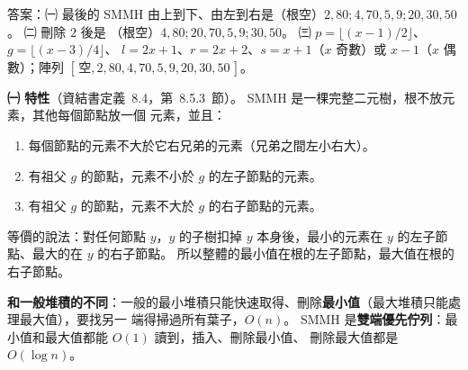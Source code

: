 \begin{pastsoln}
答案：㈠ 最後的 SMMH 由上到下、由左到右是（根空）$2, 80; 4, 70, 5, 9; 20, 30, 50$。 ㈡ 刪除 $2$ 後是
（根空）$4, 80; 20, 70, 5, 9; 30, 50$。 ㈢ $p = \lfloor (x-1)/2 \rfloor$、$g = \lfloor (x-3)/4 \rfloor$、
$l = 2x + 1$、$r = 2x + 2$、$s = x + 1$（$x$ 奇數）或 $x - 1$（$x$ 偶數）；陣列
$[\,\text{空}, 2, 80, 4, 70, 5, 9, 20, 30, 50\,]$。

\textbf{㈠ 特性}（資結書定義~8.4，第~8.5.3~節）。 SMMH 是一棵完整二元樹，根不放元素，其他每個節點放一個
元素，並且：
\begin{enumerate}
\item[P1.] 每個節點的元素不大於它右兄弟的元素（兄弟之間左小右大）。
\item[P2.] 有祖父 $g$ 的節點，元素不小於 $g$ 的左子節點的元素。
\item[P3.] 有祖父 $g$ 的節點，元素不大於 $g$ 的右子節點的元素。
\end{enumerate}
等價的說法：對任何節點 $y$，$y$ 的子樹扣掉 $y$ 本身後，最小的元素在 $y$ 的左子節點、最大的在 $y$ 的右子節點。
所以整體的最小值在根的左子節點，最大值在根的右子節點。

\textbf{和一般堆積的不同}：一般的最小堆積只能快速取得、刪除\textbf{最小值}（最大堆積只能處理最大值），要找另一
端得掃過所有葉子，$O(n)$。 SMMH 是\textbf{雙端優先佇列}：最小值和最大值都能 $O(1)$ 讀到，插入、刪除最小值、
刪除最大值都是 $O(\log n)$。


\end{pastsoln}

